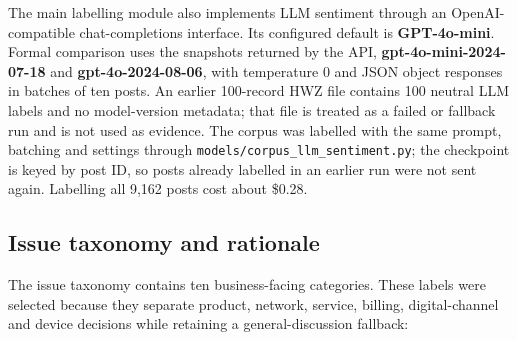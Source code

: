 \documentclass[11pt,a4paper]{article}
\begin{document}
The main labelling module also implements LLM sentiment through an OpenAI-compatible chat-completions interface. Its configured default is \textbf{GPT-4o-mini}. Formal comparison uses the snapshots returned by the API, \textbf{gpt-4o-mini-2024-07-18} and \textbf{gpt-4o-2024-08-06}, with temperature 0 and JSON object responses in batches of ten posts. An earlier 100-record HWZ file contains 100 neutral LLM labels and no model-version metadata; that file is treated as a failed or fallback run and is not used as evidence. The corpus was labelled with the same prompt, batching and settings through \texttt{models/corpus\_llm\_sentiment.py}; the checkpoint is keyed by post ID, so posts already labelled in an earlier run were not sent again. Labelling all 9,162 posts cost about \$0.28.

\subsection{Issue taxonomy and rationale}

The issue taxonomy contains ten business-facing categories. These labels were selected because they separate product, network, service, billing, digital-channel and device decisions while retaining a general-discussion fallback:
\end{document}
